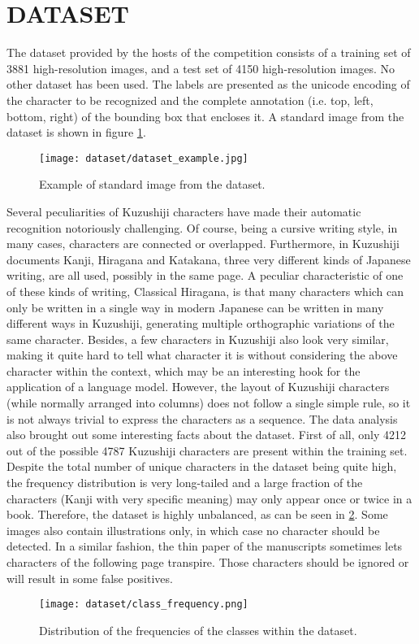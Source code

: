 \section{DATASET}
\label{sec:dataset}

The dataset provided by the hosts of the competition consists of a training set of 3881 high-resolution images, and a test set of 4150 high-resolution images. No other dataset  has been used. The labels are presented as the unicode encoding of the character to be recognized and the complete annotation (i.e. top, left, bottom, right) of the bounding box that encloses it. A standard image from the dataset is shown in figure \ref{fig:dataset_example}. \\

\begin{figure}[h]
	\caption{Example of standard image from the dataset.}
	\centering
	\texttt{[image: dataset/dataset\_example.jpg]}
	\label{fig:dataset_example}
\end{figure}

Several peculiarities of Kuzushiji characters have made their automatic recognition notoriously challenging. Of course, being a cursive writing style, in many cases, characters are connected or overlapped. Furthermore, in Kuzushiji documents Kanji, Hiragana and Katakana, three very different kinds of Japanese writing, are all used, possibly in the same page. A peculiar characteristic of one of these kinds of writing, Classical Hiragana, is that many characters which can only be written in a single way in modern Japanese can be written in many different ways in Kuzushiji, generating multiple orthographic variations of the same character. Besides, a few characters in Kuzushiji also look very similar, making it quite hard to tell what character it is without considering the above character within the context, which may be an interesting hook for the application of a language model. However, the layout of Kuzushiji characters (while normally arranged into columns) does not follow a single simple rule, so it is not always trivial to express the characters as a sequence. The data analysis also brought out some interesting facts about the dataset. First of all, only 4212 out of the possible 4787 Kuzushiji characters are present within the training set. Despite the total number of unique characters in the dataset being quite high, the frequency distribution is very long-tailed and a large fraction of the characters (Kanji with very specific meaning) may only appear once or twice in a book. Therefore, the dataset is highly unbalanced, as can be seen in \ref{fig:class-frequency}. Some images also contain illustrations only, in which case no character should be detected. In a similar fashion, the thin paper of the manuscripts sometimes lets characters of the following page transpire. Those characters should be ignored or will result in some false positives.


\begin{figure}[h]
	\caption{Distribution of the frequencies of the classes within the dataset.}
	\centering
	\texttt{[image: dataset/class\_frequency.png]}
	\label{fig:class-frequency}
\end{figure}
